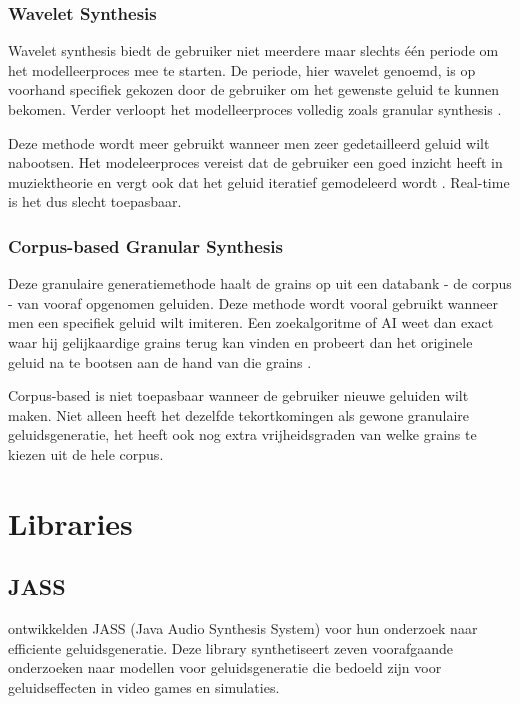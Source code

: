 \subsubsection{Wavelet Synthesis}

Wavelet synthesis biedt de gebruiker niet meerdere maar slechts één periode om het modelleerproces mee te starten. De periode, hier wavelet genoemd, is op voorhand specifiek gekozen door de gebruiker om het gewenste geluid te kunnen bekomen. Verder verloopt het modelleerproces volledig zoals granular synthesis \autocite{wavelet}.

Deze methode wordt meer gebruikt wanneer men zeer gedetailleerd geluid wilt nabootsen. Het modeleerproces vereist dat de gebruiker een goed inzicht heeft in muziektheorie en vergt ook dat het geluid iteratief gemodeleerd wordt 
\autocite{wavelet}. Real-time is het dus slecht toepasbaar.

\subsubsection{Corpus-based Granular Synthesis}

Deze granulaire generatiemethode haalt de grains op uit een databank - de corpus - van vooraf opgenomen geluiden. Deze methode wordt vooral gebruikt wanneer men een specifiek geluid wilt imiteren. Een zoekalgoritme of AI weet dan exact waar hij gelijkaardige grains terug kan vinden en probeert dan het originele geluid na te bootsen aan de hand van die grains 
\autocite{methodes}.

Corpus-based is niet toepasbaar wanneer de gebruiker nieuwe geluiden wilt maken. Niet alleen heeft het dezelfde tekortkomingen als gewone granulaire geluidsgeneratie, het heeft ook nog extra vrijheidsgraden van welke grains te kiezen uit de hele corpus.

\section{Libraries}
\label{sec:libraries}

\subsection{JASS}

\textcite{jass} ontwikkelden JASS (Java Audio Synthesis System) voor hun onderzoek naar efficiente geluidsgeneratie. Deze library synthetiseert zeven voorafgaande onderzoeken naar modellen voor geluidsgeneratie die bedoeld zijn voor geluidseffecten in video games en simulaties. 

